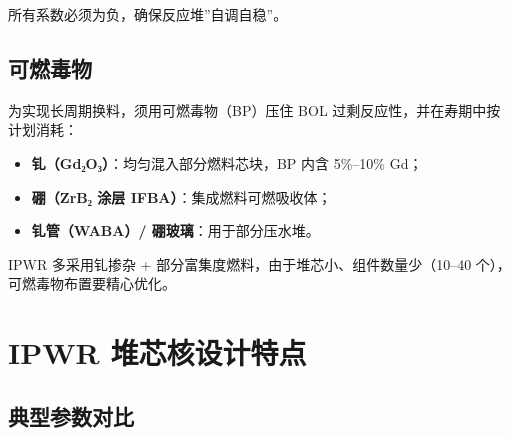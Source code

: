 \documentclass[
  UTF8,
  scheme=plain,
  fontsize=10pt,
  openany
]{ctexbook}
\begin{document}
所有系数必须为负，确保反应堆''自调自稳''。

\subsection{可燃毒物}\label{ux53efux71c3ux6bd2ux7269}

为实现长周期换料，须用可燃毒物（BP）压住 BOL
过剩反应性，并在寿期中按计划消耗：

\begin{itemize}
\tightlist
\item
  \textbf{钆（Gd₂O₃）}：均匀混入部分燃料芯块，BP 内含 5\%--10\% Gd；
\item
  \textbf{硼（ZrB₂ 涂层 IFBA）}：集成燃料可燃吸收体；
\item
  \textbf{钆管（WABA）/ 硼玻璃}：用于部分压水堆。
\end{itemize}

IPWR 多采用钆掺杂 + 部分富集度燃料，由于堆芯小、组件数量少（10--40
个），可燃毒物布置要精心优化。

\section{IPWR
堆芯核设计特点}\label{ipwr-ux5806ux82afux6838ux8bbeux8ba1ux7279ux70b9}

\subsection{典型参数对比}\label{ux5178ux578bux53c2ux6570ux5bf9ux6bd4}
\end{document}

